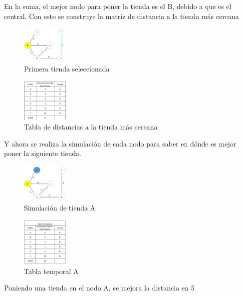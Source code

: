 \documentclass[conference,compsoc]{IEEEtran}
\begin{document}
En la suma, el mejor nodo para poner la tienda es el B, debido a que es el central.
Con esto se construye la matriz de distancia a la tienda más cercana

\begin{figure}[h] 
    \centering
    \includegraphics[width=0.20\textwidth]{Problema1/p3.png}
    \caption{Primera tienda seleccionada}
    \label{fig:mesh1}
\end{figure}

\begin{figure}[h] 
    \centering
    \includegraphics[width=0.20\textwidth]{Problema1/p4.png}
    \caption{Tabla de distancias a la tienda más cercana}
    \label{fig:mesh1}
\end{figure}
Y ahora se realiza la simulación de cada nodo para saber en dónde es mejor poner la siguiente tienda.

\begin{figure}[h]
    \centering
    \includegraphics[width=0.20\textwidth]{Problema1/p5.png}
    \caption{Simulación de tienda A }
    \label{fig:mesh1}
\end{figure}

\begin{figure}[h]
    \centering
    \includegraphics[width=0.20\textwidth]{Problema1/p6.png}
    \caption{Tabla temporal A}
    \label{fig:mesh1}
\end{figure}
$$$$$$$$
Poniendo una tienda en el nodo A, se mejora la distancia en 5
\end{document}
